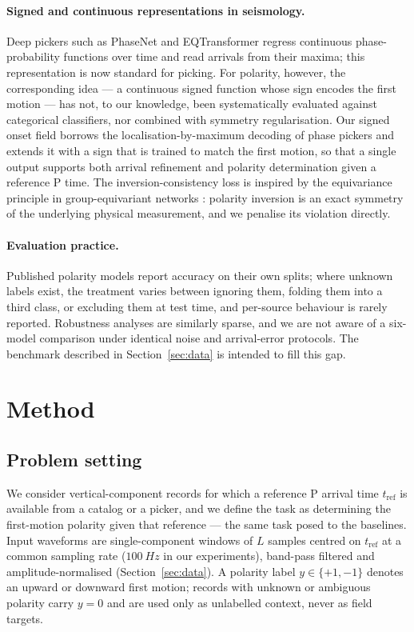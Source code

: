 \documentclass[11pt]{article}
\begin{document}
\paragraph{Signed and continuous representations in seismology.}
Deep pickers such as PhaseNet \citep{zhu2019phasenet} and EQTransformer
\citep{mousavi2020eqtransformer} regress continuous phase-probability functions
over time and read arrivals from their maxima; this representation is now
standard for picking. For polarity, however, the corresponding idea --- a
continuous signed function whose sign encodes the first motion --- has not, to
our knowledge, been systematically evaluated against categorical classifiers,
nor combined with symmetry regularisation. Our signed onset field borrows the
localisation-by-maximum decoding of phase pickers and extends it with a sign
that is trained to match the first motion, so that a single output supports
both arrival refinement and polarity determination given a reference P time.
The inversion-consistency loss is inspired by the equivariance principle in
group-equivariant networks \citep{cohen2016group}: polarity inversion is an
exact symmetry of the underlying physical measurement, and we penalise its
violation directly.

\paragraph{Evaluation practice.}
Published polarity models report accuracy on their own splits; where unknown
labels exist, the treatment varies between ignoring them, folding them into a
third class, or excluding them at test time, and per-source behaviour is
rarely reported. Robustness analyses are similarly sparse, and we are not
aware of a six-model comparison under identical noise and arrival-error
protocols. The benchmark described in Section~\ref{sec:data} is intended to
fill this gap.

\section{Method}
\label{sec:method}

\subsection{Problem setting}
\label{sec:problem}

We consider vertical-component records for which a reference P arrival time
$t_\mathrm{ref}$ is available from a catalog or a picker, and we define the
task as determining the first-motion polarity given that reference --- the same
task posed to the baselines. Input waveforms are single-component windows of
$L$ samples centred on $t_\mathrm{ref}$ at a common sampling rate ($\SI{100}{Hz}$
in our experiments), band-pass filtered and amplitude-normalised
(Section~\ref{sec:data}). A polarity label $y\in\{+1,-1\}$ denotes an upward or
downward first motion; records with unknown or ambiguous polarity carry
$y=0$ and are used only as unlabelled context, never as field targets.
\end{document}
